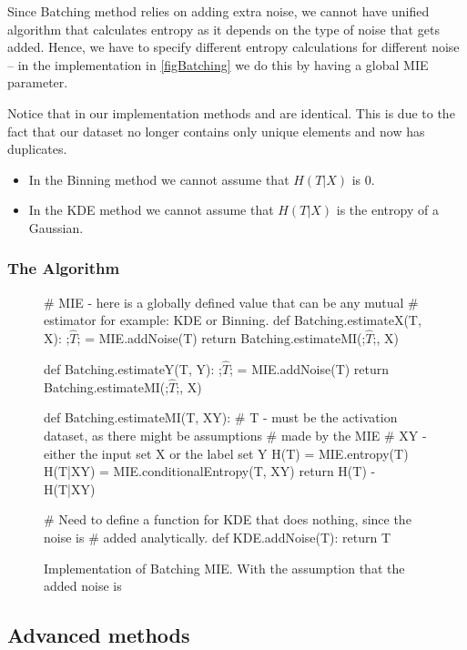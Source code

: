 \documentclass[dissertation.tex]{subfiles}
\begin{document}
Since Batching method relies on adding extra noise, we cannot have unified
algorithm that calculates entropy as it depends on the type of noise that gets
added. Hence, we have to specify different entropy calculations for different
noise -- in the implementation in \autoref{figBatching} we do this by having a
global MIE parameter.

Notice that in our implementation methods  and  are
identical. This is due to the fact that our dataset  no longer contains
only unique elements and now has duplicates. 
\begin{itemize}
  \item{
      In the Binning method we cannot assume that $H(T|X)$ is 0.
    }
  \item{
      In the KDE method we cannot assume that $H(T|X)$ is the entropy of a
      Gaussian.
    }
\end{itemize}
\subsubsection{The Algorithm}
\begin{figure}[H]
    \begin{pythonfigure}
      # MIE - here is a globally defined value that can be any mutual
      # estimator for example: KDE or Binning.
      def Batching.estimateX(T, X): 
        ;$\hat{T}$; = MIE.addNoise(T)
        return Batching.estimateMI(;$\hat{T}$;, X)

      def Batching.estimateY(T, Y): 
        ;$\hat{T}$; = MIE.addNoise(T)
        return Batching.estimateMI(;$\hat{T}$;, X)

      def Batching.estimateMI(T, XY):
          # T - must be the activation dataset, as there might be assumptions
          # made by the MIE
          # XY - either the input set X or the label set Y
          H(T) = MIE.entropy(T)
          H(T|XY) = MIE.conditionalEntropy(T, XY)
          return H(T) - H(T|XY)

      # Need to define a function for KDE that does nothing, since the noise is
      # added analytically.
      def KDE.addNoise(T):
        return T

    \end{pythonfigure}
    \caption{
      Implementation of Batching MIE. With the assumption that the added noise
      is 
    }
    \label{figBatching}
\end{figure}

\subsection{Advanced methods} \label{ssection:advanced}
\end{document}
